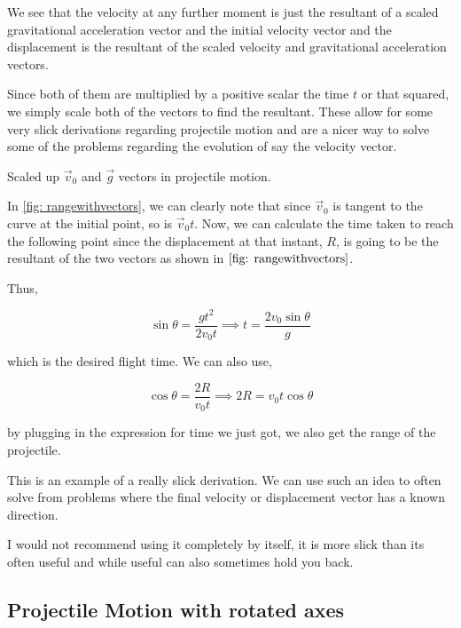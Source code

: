 We see that the velocity at any further moment is just the resultant of a scaled 
gravitational acceleration vector and the initial velocity vector and the displacement is the resultant of 
the scaled velocity and gravitational acceleration vectors. 

Since both of them are multiplied by a positive scalar the time \(t\) or that squared, we simply
scale both of the vectors to find the resultant. These allow for some very slick derivations regarding
projectile motion and are a nicer way to solve some of the problems regarding 
the evolution of say the velocity vector.

\begin{marginfigure}
    \centering
    \caption{Scaled up \(\vec{v}_0\) and \(\vec{g}\) vectors in projectile motion.}
    \label{fig: rangewithvectors}
\end{marginfigure}

In \cref{fig: rangewithvectors}, we can clearly note that since \(\vec{v}_0\) is tangent 
to the curve at the initial point, so is \(\vec{v}_0t\). Now, we can calculate 
the time taken to reach the following point since the displacement at that instant, 
\(R\), is going to be the resultant of the two vectors as shown in \(\cref{fig: rangewithvectors}\).

Thus,

\begin{equation*}
    \sin\theta = \frac{gt^2}{2v_0t} \implies t = \frac{2v_0\sin\theta}{g}
\end{equation*}

which is the desired flight time. We can also use,

\begin{equation*}
    \cos\theta = \frac{2R}{v_0t} \implies 2R = v_0t\cos\theta
\end{equation*}

by plugging in the expression for time we just got, we also get the range of the projectile. 

This is an example of a really slick derivation. We can use such an idea to often solve from 
problems where the final velocity or displacement vector has a known direction. 

I would not recommend using it completely by itself, it is more slick than its often useful
and while useful can also sometimes hold you back.

\subsection{Projectile Motion with rotated axes}

